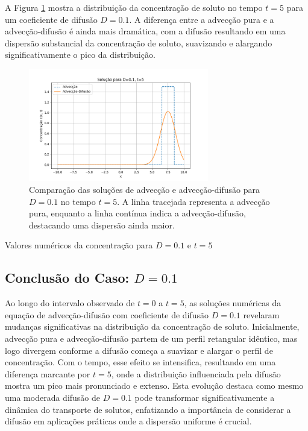 A Figura \ref{fig:advec_diffus_0.1_t5} mostra a distribuição da concentração de soluto no tempo \( t = 5 \) para um coeficiente de difusão \( D = 0.1 \). A diferença entre a advecção pura e a advecção-difusão é ainda mais dramática, com a difusão resultando em uma dispersão substancial da concentração de soluto, suavizando e alargando significativamente o pico da distribuição.

\begin{figure}[H]
    \centering
    \includegraphics[width=0.7\textwidth]{code/plot/Advec_Difus_t5_D0.1.png}
    \caption{Comparação das soluções de advecção e advecção-difusão para \( D = 0.1 \) no tempo \( t = 5 \). A linha tracejada representa a advecção pura, enquanto a linha contínua indica a advecção-difusão, destacando uma dispersão ainda maior.}
    \label{fig:advec_diffus_0.1_t5}
\end{figure}

\begin{table}[H]
    \centering
    \caption{Valores numéricos da concentração para \( D = 0.1 \) e \( t = 5 \)}
    
\end{table}


\subsection{Conclusão do Caso: \( D = 0.1 \)}
Ao longo do intervalo observado de \( t = 0 \) a \( t = 5 \), as soluções numéricas da equação de advecção-difusão com coeficiente de difusão \( D = 0.1 \) revelaram mudanças significativas na distribuição da concentração de soluto. Inicialmente, advecção pura e advecção-difusão partem de um perfil retangular idêntico, mas logo divergem conforme a difusão começa a suavizar e alargar o perfil de concentração. Com o tempo, esse efeito se intensifica, resultando em uma diferença marcante por \( t = 5 \), onde a distribuição influenciada pela difusão mostra um pico mais pronunciado e extenso. Esta evolução destaca como mesmo uma moderada difusão de \( D = 0.1 \) pode transformar significativamente a dinâmica do transporte de solutos, enfatizando a importância de considerar a difusão em aplicações práticas onde a dispersão uniforme é crucial.